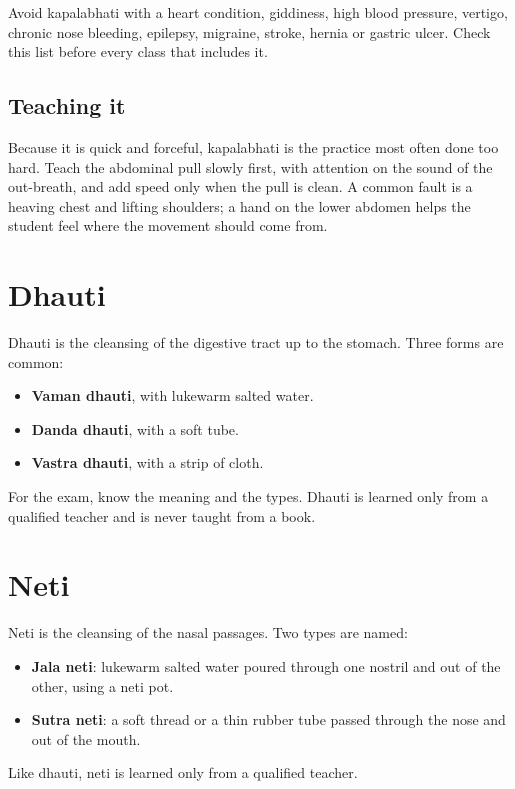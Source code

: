 \begin{caution}
Avoid kapalabhati with a heart condition, giddiness, high blood pressure, vertigo, chronic nose bleeding, epilepsy, migraine, stroke, hernia or gastric ulcer. Check this list before every class that includes it.
\end{caution}

\subsection*{Teaching it}
Because it is quick and forceful, kapalabhati is the practice most often done too hard. Teach the abdominal pull slowly first, with attention on the sound of the out-breath, and add speed only when the pull is clean. A common fault is a heaving chest and lifting shoulders; a hand on the lower abdomen helps the student feel where the movement should come from.


\section{Dhauti}

Dhauti is the cleansing of the digestive tract up to the stomach. Three forms are common:
\begin{itemize}
\item \textbf{Vaman dhauti}, with lukewarm salted water.
\item \textbf{Danda dhauti}, with a soft tube.
\item \textbf{Vastra dhauti}, with a strip of cloth.
\end{itemize}
For the exam, know the meaning and the types. Dhauti is learned only from a qualified teacher and is never taught from a book.


\section{Neti}

Neti is the cleansing of the nasal passages. Two types are named:
\begin{itemize}
\item \textbf{Jala neti}: lukewarm salted water poured through one nostril and out of the other, using a neti pot.
\item \textbf{Sutra neti}: a soft thread or a thin rubber tube passed through the nose and out of the mouth.
\end{itemize}
Like dhauti, neti is learned only from a qualified teacher.

